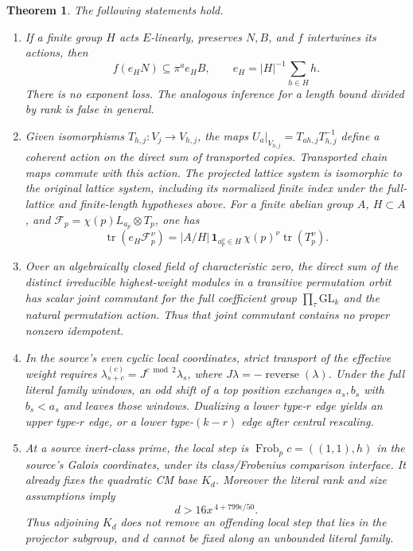 \documentclass[11pt]{article}
\newtheorem{theorem}{Theorem}[section]
\begin{document}
\begin{theorem}
The following statements hold.
\begin{enumerate}
\item If a finite group $H$ acts $E$-linearly, preserves $N,B$, and
$f$ intertwines its actions, then
\[
f(e_HN)\subseteq\pi^a e_HB,\qquad
e_H=|H|^{-1}\sum_{h\in H}h.
\]
There is no exponent loss. The analogous inference for a
length bound divided by rank is false in general.
\item Given isomorphisms $T_{h,j}:V_j\to V_{h,j}$, the maps
$U_a|_{V_{h,j}}=T_{ah,j}T_{h,j}^{-1}$ define a coherent action on
the direct sum of transported copies. Transported chain maps commute
with this action. The projected lattice system is isomorphic to the
original lattice system, including its normalized finite index under the full-lattice and finite-length hypotheses above.
For a finite abelian group $A$, $H\subset A$, and
$\mathcal F_p=\chi(p)L_{a_p}\otimes T_p$, one has
\[
\operatorname{tr}(e_H\mathcal F_p^\nu)
=|A/H|\,\mathbf{1}_{a_p^\nu\in H}\,
\chi(p)^\nu\operatorname{tr}(T_p^\nu).
\]
\item Over an algebraically closed field of characteristic zero,
the direct sum of the distinct irreducible highest-weight modules
in a transitive permutation orbit has scalar joint commutant for
the full coefficient group $\prod_\tau\mathrm{GL}_k$ and the
natural permutation action. Thus that joint commutant contains
no proper nonzero idempotent.
\item In the source's even cyclic local coordinates, strict
transport of the effective weight requires
$\lambda^{(c)}_{s+c}=J^{c\bmod2}\lambda_s$, where
$J\lambda=-\operatorname{reverse}(\lambda)$. Under the full literal
family windows, an odd shift of a top position exchanges
$a_s,b_s$ with $b_s<a_s$ and leaves those windows.
Dualizing a lower type-$r$ edge yields an upper type-$r$ edge,
or a lower type-$(k-r)$ edge after central rescaling.
\item At a source inert-class prime, the local step is
$\operatorname{Frob}_p c=((1,1),h)$ in the source's Galois
coordinates, under its class/Frobenius comparison interface.
It already fixes the quadratic CM base $K_d$.
Moreover the literal rank and size assumptions imply
\[
d>16x^{\,4+799\epsilon/50}.
\]
Thus adjoining $K_d$ does not remove an offending local step
that lies in the projector subgroup, and $d$ cannot be fixed
along an unbounded literal family.
\end{enumerate}
\end{theorem}
\end{document}
